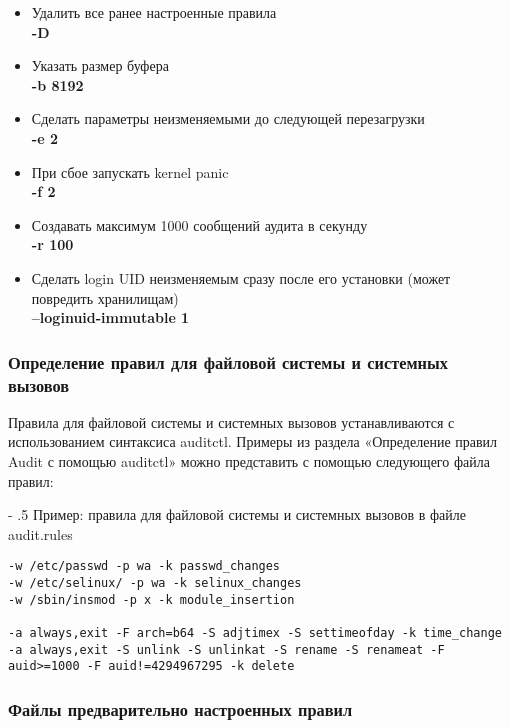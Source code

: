 \documentclass[a4paper,10pt,twoside]{article}
\makeatletter
\renewcommand\paragraph{%
   \@startsection{paragraph}{4}{0mm}%
      {-\baselineskip}%
      {.5\baselineskip}%
      {\normalfont\normalsize\bfseries}}
\makeatother
\begin{document}
\begin{itemize}
 \item Удалить все ранее настроенные правила\\
\textbf{-D}
\item Указать размер буфера\\
\textbf{-b 8192}
\item  Сделать параметры неизменяемыми до следующей перезагрузки\\
\textbf{-e 2}
\item  При сбое запускать kernel panic\\
\textbf{-f 2}
\item Создавать максимум 1000 сообщений аудита в секунду\\
\textbf{-r 100}
\item  Сделать login UID неизменяемым сразу после его установки (может повредить хранилищам)\\
\textbf{--loginuid-immutable 1}
\end{itemize}



\subsubsection{Определение правил для файловой системы и системных вызовов}

Правила для файловой системы и системных вызовов устанавливаются с использованием синтаксиса auditctl. Примеры из раздела «Определение правил Audit с помощью auditctl» можно представить с помощью следующего файла правил:
⁠

\paragraph{Пример: правила для файловой системы и системных вызовов в файле audit.rules}


\begin{verbatim}
-w /etc/passwd -p wa -k passwd_changes
-w /etc/selinux/ -p wa -k selinux_changes
-w /sbin/insmod -p x -k module_insertion

-a always,exit -F arch=b64 -S adjtimex -S settimeofday -k time_change
-a always,exit -S unlink -S unlinkat -S rename -S renameat -F auid>=1000 -F auid!=4294967295 -k delete
\end{verbatim} 



\subsubsection{Файлы предварительно настроенных правил}
\end{document}
